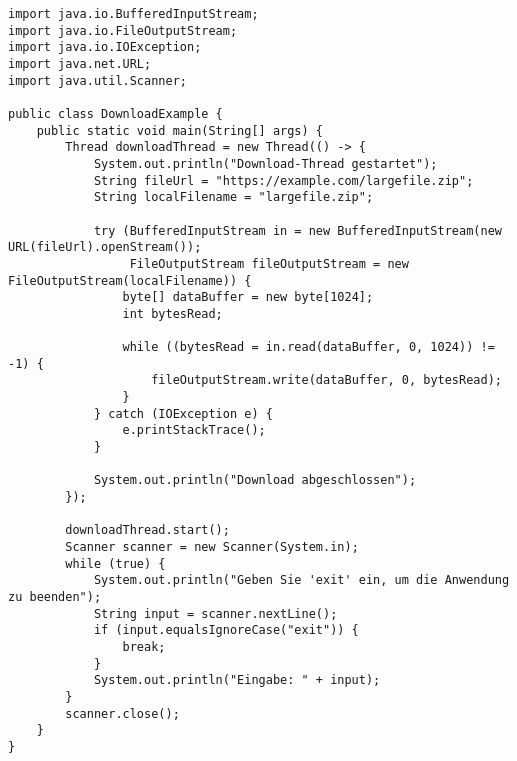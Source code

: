 \documentclass[../vs-script-first-v01.tex]{subfiles}
\begin{document}

\noindent\begin{lstlisting}[caption={Threads zur Organisation},captionpos=b,label={lst:down}]
import java.io.BufferedInputStream;
import java.io.FileOutputStream;
import java.io.IOException;
import java.net.URL;
import java.util.Scanner;

public class DownloadExample {
    public static void main(String[] args) {
        Thread downloadThread = new Thread(() -> {
            System.out.println("Download-Thread gestartet");
            String fileUrl = "https://example.com/largefile.zip";
            String localFilename = "largefile.zip";

            try (BufferedInputStream in = new BufferedInputStream(new URL(fileUrl).openStream());
                 FileOutputStream fileOutputStream = new FileOutputStream(localFilename)) {
                byte[] dataBuffer = new byte[1024];
                int bytesRead;

                while ((bytesRead = in.read(dataBuffer, 0, 1024)) != -1) {
                    fileOutputStream.write(dataBuffer, 0, bytesRead);
                }
            } catch (IOException e) {
                e.printStackTrace();
            }

            System.out.println("Download abgeschlossen");
        });

        downloadThread.start();
        Scanner scanner = new Scanner(System.in);
        while (true) {
            System.out.println("Geben Sie 'exit' ein, um die Anwendung zu beenden");
            String input = scanner.nextLine();
            if (input.equalsIgnoreCase("exit")) {
                break;
            }
            System.out.println("Eingabe: " + input);
        }
        scanner.close();
    }
}
\end{lstlisting}
\end{document}

